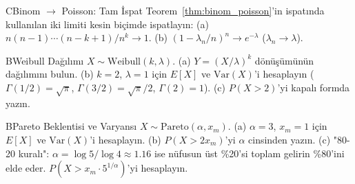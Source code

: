 \begin{alistirma}[Al.5.12]{C}{Binom $\to$ Poisson: Tam İspat}
Teorem~\ref{thm:binom_poisson}'in ispatında kullanılan iki limiti kesin biçimde ispatlayın:
(a) $n(n-1)\cdots(n-k+1)/n^k \to 1$.
(b) $(1 - \lambda_n/n)^n \to e^{-\lambda}$ ($\lambda_n \to \lambda$).
\end{alistirma}

\begin{alistirma}[Al.5.13]{B}{Weibull Dağılımı}
$X \sim \mathrm{Weibull}(k, \lambda)$.
(a) $Y = (X/\lambda)^k$ dönüşümünün dağılımını bulun.
(b) $k = 2$, $\lambda = 1$ için $E[X]$ ve $\mathrm{Var}(X)$'i hesaplayın
    ($\Gamma(1/2) = \sqrt{\pi}$, $\Gamma(3/2) = \sqrt{\pi}/2$, $\Gamma(2) = 1$).
(c) $P(X > 2)$'yi kapalı formda yazın.
\end{alistirma}

\begin{alistirma}[Al.5.14]{B}{Pareto Beklentisi ve Varyansı}
$X \sim \mathrm{Pareto}(\alpha, x_m)$.
(a) $\alpha = 3$, $x_m = 1$ için $E[X]$ ve $\mathrm{Var}(X)$'i hesaplayın.
(b) $P(X > 2x_m)$'yi $\alpha$ cinsinden yazın.
(c) "80-20 kuralı": $\alpha = \log 5/\log 4 \approx 1.16$ ise nüfusun üst \%20'si
    toplam gelirin \%80'ini elde eder. $P(X > x_m \cdot 5^{1/\alpha})$'yi hesaplayın.
\end{alistirma}

